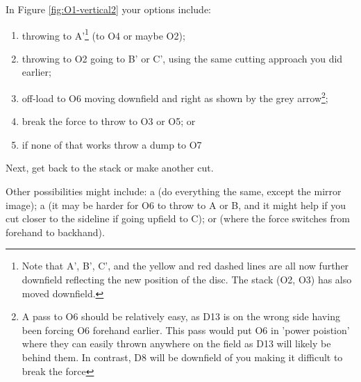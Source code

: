 \documentclass{tufte-handout}
\begin{document}
 In Figure \ref{fig:O1-vertical2}
your options include:
\begin{enumerate}
\item throwing to A'\footnote{
Note that A', B', C', and 
the yellow and red dashed lines 
are all now further downfield 
reflecting the new position of the disc.
The stack (O2, O3) 
has also moved downfield.}  
(to O4 or maybe O2);
\item throwing to O2 going to B' or C', 
using the same cutting approach
you did earlier;
\item off-load to O6 
moving downfield and right
as shown by the grey arrow\footnote{
A pass to O6 
should be relatively easy, 
as D13 is on the wrong side having been forcing O6 forehand earlier.   
This pass would put O6
in 'power poistion'
where they can easily 
thrown anywhere on the field 
as D13 will likely be behind them. 
In contrast, D8 
will be downfield 
of you
making it difficult to 
break the force}; 
\item break the force 
to throw to O3 
or O5; or 
\item if none of that works
throw a dump to O7
\end{enumerate}
Next, get back to the stack
or make another cut.

Other possibilities might include: 
a 
(do everything the same, except the mirror image); 
a 
(it may be harder for O6 to throw to A or B, 
and it might help if 
you cut closer to the sideline 
if going upfield to C); or
(where the force switches 
from forehand to backhand).
\end{document}
